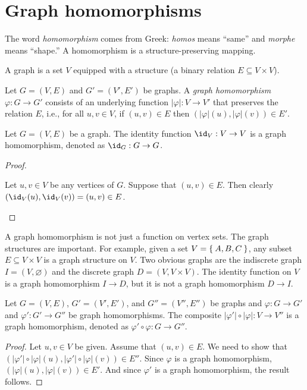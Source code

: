 \documentclass{zett}
\begin{document}
\section{Graph homomorphisms}
\label{sec:graph-homomorphisms}

\begin{node}
  The word \emph{homomorphism} comes from Greek: \emph{homos} means ``same'' and \emph{morphe} means ``shape.''
  A homomorphism is a structure-preserving mapping.
\end{node}
\begin{node}
  A graph is a set $V$ equipped with a structure (a binary relation $E \subseteq V \times V$).
\end{node}

\begin{defn}
  Let $G = (V,E)$ and $G' = (V',E')$ be graphs.
  A \emph{graph homomorphism} $\varphi : G \to G'$ consists of an underlying function $|\varphi| : V \to V'$ that preserves the relation $E$, i.e., for all $u, v \in V$, if $(u,v) \in E$ then $(|\varphi|(u),|\varphi|(v)) \in E'$.
\end{defn}

\begin{lem}
  Let $G = (V, E)$ be a graph.
  The identity function $\id_{V} : V \to V$ is a graph homomorphism, denoted as $\id_{G} : G \to G$.
\end{lem}
\begin{proof}
  \begin{node}
    Let $u,v \in V$ be any vertices of $G$.
    Suppose that $(u,v) \in E$.
    Then clearly $(\id_{V}(u), \id_{V}(v)) = (u,v) \in E$.
  \end{node}
\end{proof}

\begin{node}
  \label{node:homomorphism-not-just-function}
  A graph homomorphism is not just a function on vertex sets.
  The graph structures are important.
  For example, given a set $V = \Set{A,B,C}$, any subset $E \subseteq V \times V$ is a graph structure on $V$.
  Two obvious graphs are the indiscrete graph $I = (V,\varnothing)$ and the discrete graph $D = (V,V \times V)$.
  The identity function on $V$ is a graph homomorphism $I \to D$, but it is not a graph homomorphism $D \to I$.
\end{node}

\begin{lem}
  Let $G = (V, E)$, $G' = (V', E')$, and $G'' = (V'', E'')$ be graphs and $\varphi : G \to G'$ and $\varphi' : G' \to G''$ be graph homomorphisms.
  The composite $|\varphi'| \circ |\varphi| : V \to V''$ is a graph homomorphism, denoted as $\varphi' \circ \varphi : G \to G''$.
\end{lem}
\begin{proof}
  Let $u,v \in V$ be given.
  Assume that $(u,v) \in E$.
  We need to show that $(|\varphi'| \circ |\varphi|(u),|\varphi'| \circ |\varphi|(v)) \in E''$.
  Since $\varphi$ is a graph homomorphism, $(|\varphi|(u),|\varphi|(v)) \in E'$.
  And since $\varphi'$ is a graph homomorphism, the result follows.
\end{proof}
\end{document}
